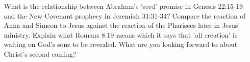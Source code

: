\begin{questions}
\q What is the relationship between Abraham's `seed' promise in Genesis 22:15-19 and the New Covenant prophecy in Jeremiah 31:31-34?
\q Compare the reaction of Anna and Simeon to Jesus against the reaction of the Pharisees later in Jesus' ministry.
\q Explain what Romans 8:19 means which it says that 'all creation' is waiting on God's sons to be revealed.
\q What are you looking forward to about Christ's second coming?
\end{questions}